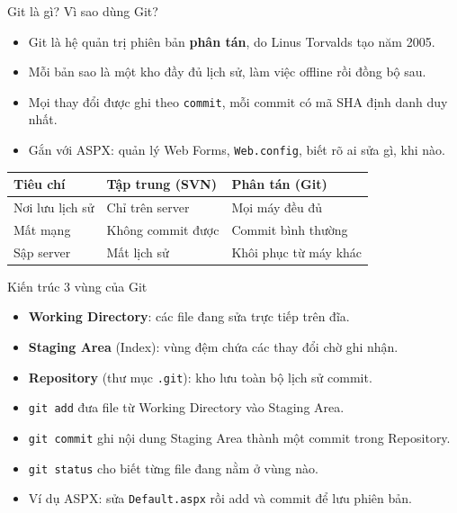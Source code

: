 \begin{frame}{Git là gì? Vì sao dùng Git?}
\begin{itemize}
  \item Git là hệ quản trị phiên bản \textbf{phân tán}, do Linus Torvalds tạo năm 2005.
  \item Mỗi bản sao là một kho đầy đủ lịch sử, làm việc offline rồi đồng bộ sau.
  \item Mọi thay đổi được ghi theo \texttt{commit}, mỗi commit có mã SHA định danh duy nhất.
  \item Gắn với ASPX: quản lý Web Forms, \texttt{Web.config}, biết rõ ai sửa gì, khi nào.
\end{itemize}
\vspace{0.3em}
\begin{tabular}{lll}
\toprule
Tiêu chí & Tập trung (SVN) & Phân tán (Git) \\
\midrule
Nơi lưu lịch sử & Chỉ trên server & Mọi máy đều đủ \\
Mất mạng & Không commit được & Commit bình thường \\
Sập server & Mất lịch sử & Khôi phục từ máy khác \\
\bottomrule
\end{tabular}
\end{frame}

\begin{frame}{Kiến trúc 3 vùng của Git}
\begin{itemize}
  \item \textbf{Working Directory}: các file đang sửa trực tiếp trên đĩa.
  \item \textbf{Staging Area} (Index): vùng đệm chứa các thay đổi chờ ghi nhận.
  \item \textbf{Repository} (thư mục \texttt{.git}): kho lưu toàn bộ lịch sử commit.
  \item \texttt{git add} đưa file từ Working Directory vào Staging Area.
  \item \texttt{git commit} ghi nội dung Staging Area thành một commit trong Repository.
  \item \texttt{git status} cho biết từng file đang nằm ở vùng nào.
  \item Ví dụ ASPX: sửa \texttt{Default.aspx} rồi add và commit để lưu phiên bản.
\end{itemize}
\end{frame}

